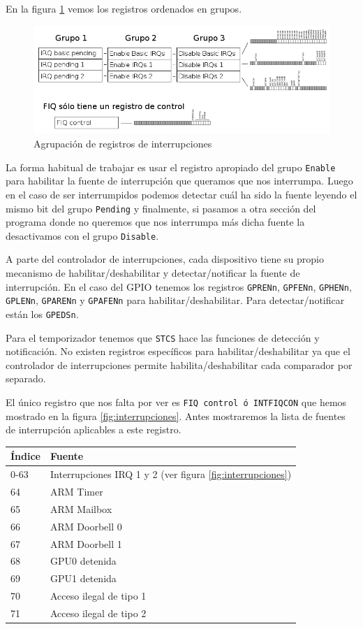 En la figura \ref{fig:interrupcionesgrupos} vemos los registros ordenados en grupos.

\begin{figure}[h]
  \centering
    \includegraphics[width=15cm]{graphs/interrupcionesgrupos.png}
  \caption{Agrupación de registros de interrupciones}
  \label{fig:interrupcionesgrupos}
\end{figure}

La forma habitual de trabajar es usar el registro apropiado del grupo {\tt Enable} para
habilitar la fuente de interrupción que queramos que nos interrumpa. Luego en el caso de
ser interrumpidos podemos detectar cuál ha sido la fuente leyendo el mismo bit del
grupo {\tt Pending} y finalmente, si pasamos a otra sección del programa donde no queremos
que nos interrumpa más dicha fuente la desactivamos con el grupo {\tt Disable}.

A parte del controlador de interrupciones, cada dispositivo tiene su propio mecanismo de
habilitar/deshabilitar y detectar/notificar la fuente de interrupción. En el caso del GPIO tenemos
los registros {\tt GPRENn}, {\tt GPFENn}, {\tt GPHENn}, {\tt GPLENn}, {\tt GPARENn} y {\tt GPAFENn}
para habilitar/deshabilitar. Para detectar/notificar están los {\tt GPEDSn}.

Para el temporizador tenemos que {\tt STCS} hace las funciones de detección y notificación. No
existen registros específicos para habilitar/deshabilitar ya que el controlador de
interrupciones permite habilita/deshabilitar cada comparador por separado.

El único registro que nos falta por ver es {\tt FIQ control ó INTFIQCON} que hemos
mostrado en la figura \ref{fig:interrupciones}. Antes mostraremos la lista de fuentes
de interrupción aplicables a este registro.

\begin{longtable}{ p{2cm} | p{6cm}}
\hline
{\bf Índice} & {\bf Fuente} \\ \hline
0-63  & Interrupciones IRQ 1 y 2 (ver figura \ref{fig:interrupciones})  \\ \hline
64    & ARM Timer  \\ \hline
65    & ARM Mailbox \\ \hline
66    & ARM Doorbell 0 \\ \hline
67    & ARM Doorbell 1 \\ \hline
68    & GPU0 detenida \\ \hline
69    & GPU1 detenida \\ \hline
70    & Acceso ilegal de tipo 1 \\ \hline
71    & Acceso ilegal de tipo 2 \\ \hline
\end{longtable}

